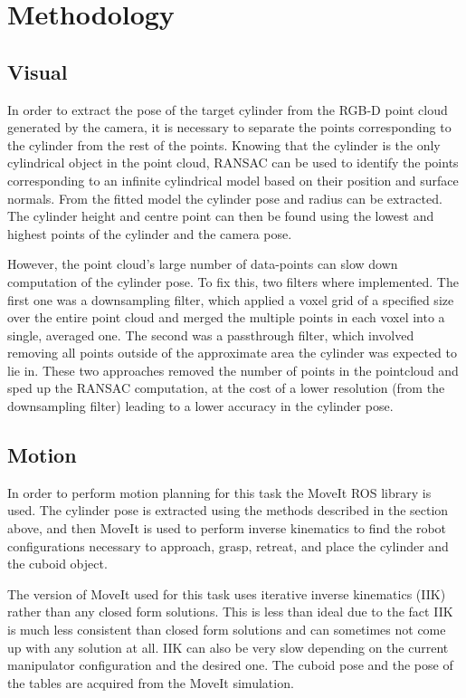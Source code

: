 \section{Methodology}\label{Sec:intro}
\subsection*{Visual}\label{Sec:methvis}
In order to extract the pose of the target cylinder from the RGB-D point cloud generated by the camera, it is necessary to separate the points corresponding to the cylinder from the rest of the points. Knowing that the cylinder is the only cylindrical object in the point cloud, RANSAC can be used to identify the points corresponding to an infinite cylindrical model based on their position and surface normals. From the fitted model the cylinder pose and radius can be extracted. The cylinder height and centre point can then be found using the lowest and highest points of the cylinder and the camera pose.

However, the point cloud's large number of data-points can slow down computation of the cylinder pose. To fix this, two filters where implemented. The first one was a downsampling filter, which applied a voxel grid of a specified size over the entire point cloud and merged the multiple points in each voxel into a single, averaged one. The second was a passthrough filter, which involved removing all points outside of the approximate area the cylinder was expected to lie in. These two approaches removed the number of points in the pointcloud and sped up the RANSAC computation, at the cost of a lower resolution (from the downsampling filter) leading to a lower accuracy in the cylinder pose.
\subsection*{Motion}
In order to perform motion planning for this task the MoveIt ROS library is used. The cylinder pose is extracted using the methods described in the section above, and then MoveIt is used to perform inverse kinematics to find the robot configurations necessary to approach, grasp, retreat, and place the cylinder and the cuboid object.

The version of MoveIt used for this task uses iterative inverse kinematics (IIK) rather than any closed form solutions. This is less than ideal due to the fact IIK is much less consistent than closed form solutions and can sometimes not come up with any solution at all. IIK can also be very slow depending on the current manipulator configuration and the desired one. The cuboid pose and the pose of the tables are acquired from the MoveIt simulation. 
